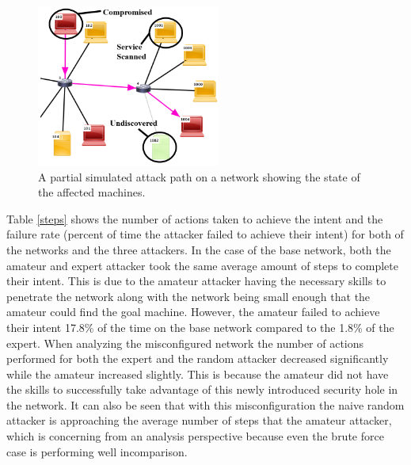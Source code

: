\documentclass[conference]{IEEEtran}
\begin{document}
\begin{figure}[htbp]
	\centering
	\includegraphics[width=6cm,keepaspectratio]{NetworkDiagram2.png}
	\caption{A partial simulated attack path on a network showing the state of the affected machines.}
	\label{fig:network}
\end{figure}

Table \ref{steps} shows the number of actions taken to achieve the intent and the failure rate (percent of time the attacker failed to achieve their intent) for both of the networks and the three attackers.   In the case of the base network, both the amateur and expert attacker took the same average amount of steps to complete their intent.  This is due to the amateur attacker having the necessary skills to penetrate the network along with the network being small enough that the amateur could find the goal machine.  However, the amateur failed to achieve their intent 17.8\% of the time on the base network compared to the 1.8\% of the expert.   When analyzing the misconfigured network the number of actions performed for both the expert and the random attacker decreased significantly while the amateur increased slightly.  This is because the amateur did not have the skills to successfully take advantage of this newly introduced security hole in the network.  It can also be seen that with this misconfiguration the naive random attacker is approaching the average number of steps that the amateur attacker, which is concerning from an analysis perspective because even the brute force case is performing well incomparison.
\end{document}
